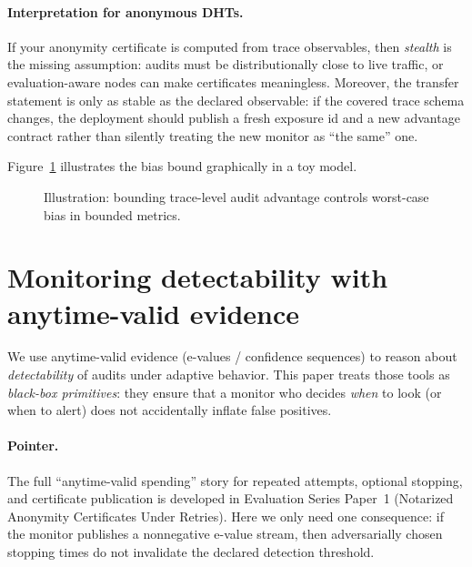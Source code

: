 \documentclass[11pt]{article}
\begin{document}
\paragraph{Interpretation for anonymous DHTs.}
If your anonymity certificate is computed from trace observables, then \emph{stealth} is the missing assumption:
audits must be distributionally close to live traffic, or evaluation-aware nodes can make certificates meaningless.
Moreover, the transfer statement is only as stable as the declared observable: if the covered trace schema changes, the deployment should publish a fresh exposure id and a new advantage contract rather than silently treating the new monitor as ``the same'' one.

Figure~\ref{fig:adv_contract_bias} illustrates the bias bound graphically in a toy model.

\begin{figure}[t]
\centering
{}
\caption{Illustration: bounding trace-level audit advantage controls worst-case bias in bounded metrics.}
\label{fig:adv_contract_bias}
\end{figure}

\section{Monitoring detectability with anytime-valid evidence}
We use anytime-valid evidence (e-values / confidence sequences) to reason about \emph{detectability} of audits under adaptive behavior.
This paper treats those tools as \emph{black-box primitives}: they ensure that a monitor who decides \emph{when} to look (or when to alert) does not accidentally inflate false positives.

\paragraph{Pointer.}
The full ``anytime-valid spending'' story for repeated attempts, optional stopping, and certificate publication is developed in Evaluation Series Paper~1 (Notarized Anonymity Certificates Under Retries).
Here we only need one consequence: if the monitor publishes a nonnegative e-value stream, then adversarially chosen stopping times do not invalidate the declared detection threshold.
\end{document}
